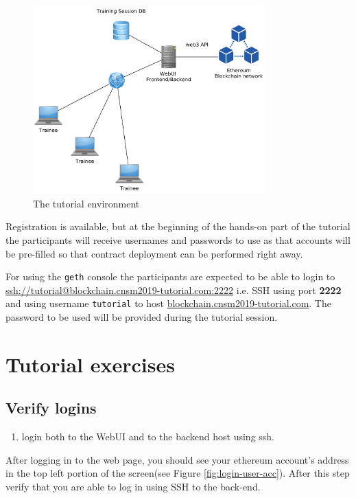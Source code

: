 \documentclass[a4paper]{article}
\begin{document}
\begin{figure}[H]
    \centering
    \includegraphics[width=0.8\textwidth]{figures/env.png}
    \caption{The tutorial environment}
    \label{fig:demo-env}
\end{figure}

Registration is available, but at the beginning of the hands-on part of the tutorial the participants will receive usernames and passwords to use as that accounts will be pre-filled so that contract deployment can be performed right away.

For using the \texttt{geth} console the participants are expected to be able to login to \url{ssh://tutorial@blockchain.cnsm2019-tutorial.com:2222} i.e. SSH using port \textbf{2222} and using username \texttt{tutorial} to host \url{blockchain.cnsm2019-tutorial.com}. The password to be used will be provided during the tutorial session.

\section{Tutorial exercises}

\subsection{Verify logins}

\begin{enumerate}[label=\textbf{Task \arabic*}:, series=l_tasks]
\item login both to the WebUI and to the backend host using ssh.
\end{enumerate}

After logging in to the web page, you should see your ethereum account's address in the top left portion of the screen(see Figure \ref{fig:login-user-acc}). After this step verify that you are able to log in using SSH to the back-end.
\end{document}
